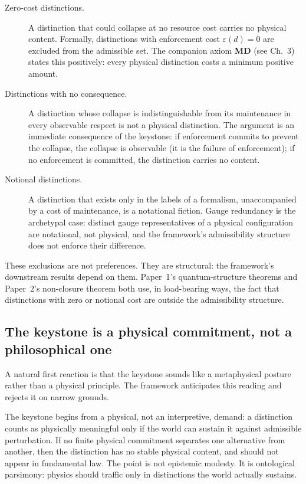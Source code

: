 \documentclass[11pt]{article}
\begin{document}
\begin{description}
    \item[Zero-cost distinctions.] A distinction that could collapse at no resource cost carries no physical content. Formally, distinctions with enforcement cost $\varepsilon(d) = 0$ are excluded from the admissible set. The companion axiom \textbf{MD} (see Ch.~3) states this positively: every physical distinction costs a minimum positive amount.
    \item[Distinctions with no consequence.] A distinction whose collapse is indistinguishable from its maintenance in every observable respect is not a physical distinction. The argument is an immediate consequence of the keystone: if enforcement commits to prevent the collapse, the collapse is observable (it is the failure of enforcement); if no enforcement is committed, the distinction carries no content.
    \item[Notional distinctions.] A distinction that exists only in the labels of a formalism, unaccompanied by a cost of maintenance, is a notational fiction. Gauge redundancy is the archetypal case: distinct gauge representatives of a physical configuration are notational, not physical, and the framework's admissibility structure does not enforce their difference.
\end{description}

\noindent These exclusions are not preferences. They are structural: the framework's downstream results depend on them. Paper~1's quantum-structure theorems and Paper~2's non-closure theorem both use, in load-bearing ways, the fact that distinctions with zero or notional cost are outside the admissibility structure.

\subsection{The keystone is a physical commitment, not a philosophical one}\label{sec:keystone_physical_not_philosophical}

A natural first reaction is that the keystone sounds like a metaphysical posture rather than a physical principle. The framework anticipates this reading and rejects it on narrow grounds.

The keystone begins from a physical, not an interpretive, demand: a distinction counts as physically meaningful only if the world can sustain it against admissible perturbation. If no finite physical commitment separates one alternative from another, then the distinction has no stable physical content, and should not appear in fundamental law. The point is not epistemic modesty. It is ontological parsimony: physics should traffic only in distinctions the world actually sustains.
\end{document}
